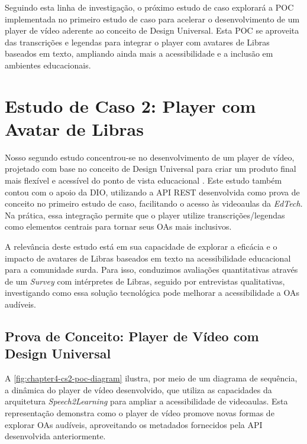 Seguindo esta linha de investigação, o próximo estudo de caso explorará a POC implementada no primeiro estudo de caso para acelerar o desenvolvimento de um player de vídeo aderente ao conceito de Design Universal. Esta POC se aproveita das transcrições e legendas para integrar o player com avatares de Libras baseados em texto, ampliando ainda mais a acessibilidade e a inclusão em ambientes educacionais.

\section{Estudo de Caso 2: Player com Avatar de Libras}

Nosso segundo estudo concentrou-se no desenvolvimento de um player de vídeo, projetado com base no conceito de Design Universal para criar um produto final mais flexível e acessível do ponto de vista educacional \cite{GovBr2023}. Este estudo também contou com o apoio da DIO, utilizando a API REST desenvolvida como prova de conceito no primeiro estudo de caso, facilitando o acesso às videoaulas da \textit{EdTech}. Na prática, essa integração permite que o player utilize transcrições/legendas como elementos centrais para tornar seus OAs mais inclusivos.

A relevância deste estudo está em sua capacidade de explorar a eficácia e o impacto de avatares de Libras baseados em texto na acessibilidade educacional para a comunidade surda. Para isso, conduzimos avaliações quantitativas através de um \textit{Survey} com intérpretes de Libras, seguido por entrevistas qualitativas, investigando como essa solução tecnológica pode melhorar a acessibilidade a OAs audíveis.

\subsection{Prova de Conceito: Player de Vídeo com Design Universal}

A \autoref{fig:chapter4-cs2-poc-diagram} ilustra, por meio de um diagrama de sequência, a dinâmica do player de vídeo desenvolvido, que utiliza as capacidades da arquitetura \textit{Speech2Learning} para ampliar a acessibilidade de videoaulas. Esta representação demonstra como o player de vídeo promove novas formas de explorar OAs audíveis, aproveitando os metadados fornecidos pela API desenvolvida anteriormente.

